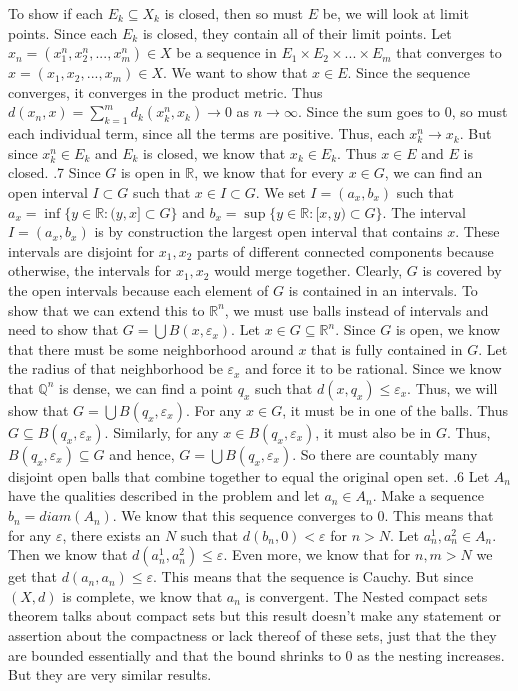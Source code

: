 \documentclass[12pt]{exam}
\begin{document}
\begin{questions}
To show if each $E_k \subseteq X_k$ is closed, then so must $E$ be, we will look at limit points. Since each $E_k$ is closed, they contain all of their limit points. Let $x_n = (x_1^n, x_2^n, ..., x^n_m) \in X$ be a sequence in $E_1 \times E_2 \times ... \times E_m$ that converges to $x = (x_1, x_2, ..., x_m) \in X$. We want to show that $x \in E$. Since the sequence converges, it converges in the product metric. Thus $d(x_n, x) = \sum_{k=1}^{m} d_k(x^n_k, x_k) \rightarrow 0$ as $n\rightarrow \infty$. Since the sum goes to $0$, so must each individual term, since all the terms are positive. Thus, each $x^n_k \rightarrow x_k$. But since $x_k^n \in E_k$ and $E_k$ is closed, we know that $x_k \in E_k$. Thus $x \in E$ and $E$ is closed. 
.7\newline
Since $G$ is open in $\mathbb{R}$, we know that for every $x \in G$, we can find an open interval $I \subset G$ such that $x \in I \subset G$. We set $I = (a_x, b_x)$ such that $a_x = \inf\{y \in \mathbb{R} : (y,x] \subset G\}$ and $b_x = \sup\{y \in \mathbb{R} : [x,y) \subset G\}$. The interval $I = (a_x, b_x)$ is by construction the largest open interval that contains $x$. These intervals are disjoint for $x_1, x_2$ parts of different connected components because otherwise, the intervals for $x_1, x_2$ would merge together. Clearly, $G$ is covered by the open intervals because each element of $G$ is contained in an intervals. To show that we can extend this to $\mathbb{R}^n$, we must use balls instead of intervals and need to show that $G = \bigcup B(x, \varepsilon_x)$. Let $x \in G \subseteq \mathbb{R}^n$. Since $G$ is open, we know that there must be some neighborhood around $x$ that is fully contained in $G$. Let the radius of that neighborhood be $\varepsilon_x$ and force it to be rational. Since we know that $\mathbb{Q}^n$ is dense, we can find a point $q_x$ such that $d(x, q_x) \leq \varepsilon_x$. Thus, we will show that $G = \bigcup B(q_x, \varepsilon_x)$. For any $x\in G$, it must be in one of the balls. Thus $G\subseteq  B(q_x, \varepsilon_x)$. Similarly, for any $x \in B(q_x, \varepsilon_x)$, it must also be in $G$. Thus, $B(q_x, \varepsilon_x)\subseteq G $ and hence, $G = \bigcup B(q_x, \varepsilon_x)$. So there are countably many disjoint open balls that combine together to equal the original open set. 
.6 \newline
Let $A_n$ have the qualities described in the problem and let $a_n \in A_n$. Make a sequence $b_n = {diam(A_n)}$. We know that this sequence converges to $0$. This means that for any $\varepsilon$, there exists an $N$ such that $d(b_n, 0) < \varepsilon$ for $n > N$. Let $a^1_n, a^2_n \in A_n$. Then we know that $d(a^1_n, a^2_n) \leq \varepsilon$. Even more, we know that for $n,m > N$ we get that $d(a_n, a_n) \leq \varepsilon$. This means that the sequence is Cauchy. But since $(X, d)$ is complete, we know that $a_n$ is convergent. The Nested compact sets theorem talks about compact sets but this result doesn't make any statement or assertion about the compactness or lack thereof of these sets, just that the they are bounded essentially and that the bound shrinks to $0$ as the nesting increases. But they are very similar results.

\end{questions}
\end{document}
